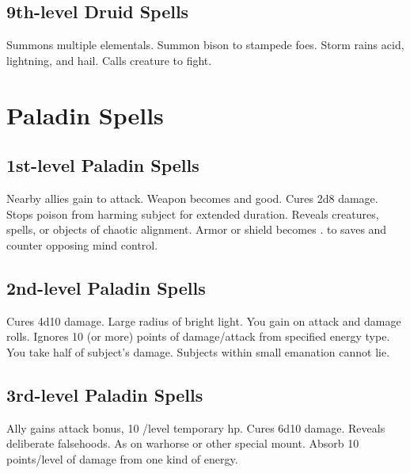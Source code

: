 \subsection{9th-level Druid Spells}
\begin{spelllist}
 Summons multiple elementals.
 Summon bison to stampede foes.
 Storm rains acid, lightning, and hail.
 Calls creature to fight.
\end{spelllist}

\section{Paladin Spells}  

\subsection{1st-level Paladin Spells}
\begin{spelllist}
 Nearby allies gain  to attack.
 Weapon becomes  and good.
 Cures 2d8 damage.
 Stops poison from harming subject for extended duration.
 Reveals creatures, spells, or objects of chaotic alignment.
 Armor or shield becomes .
  to saves and counter opposing mind control.
\end{spelllist}

\subsection{2nd-level Paladin Spells}
\begin{spelllist}
 Cures 4d10 damage.
 Large radius of bright light.
 You gain  on attack and damage rolls.
 Ignores 10 (or more) points of damage/attack from specified energy type.
\F You take half of subject's damage.
 Subjects within small emanation cannot lie.
\end{spelllist}

\subsection{3rd-level Paladin Spells}
\begin{spelllist} 
 Ally gains  attack bonus, 10 /level temporary hp.
 Cures 6d10 damage.
 Reveals deliberate falsehoods.
 As  on warhorse or other special mount.
 Absorb 10 points/level of damage from one kind of energy.
\end{spelllist}

